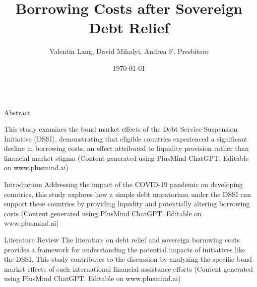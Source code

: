 \documentclass[final]{beamer}
\title{\Huge Borrowing Costs after Sovereign Debt Relief} %
\author{\Large Valentin Lang, David Mihalyi, Andrea F. Presbitero} %
\institute{\Large University of Mannheim, Natural Resource Governance Institute, Johns Hopkins University} %
\date{\Large\today} %
\begin{document}
\begin{frame}[t]

\begin{block}{}
\centering
\maketitle
\end{block}

\begin{columns}[T] %

\begin{column}{.32\textwidth}
    \begin{block}{\Huge Abstract} %


    \Large %
    This study examines the bond market effects of the Debt Service Suspension Initiative (DSSI), demonstrating that eligible countries experienced a significant decline in borrowing costs, an effect attributed to liquidity provision rather than financial market stigma
    \normalsize (Content generated using PlusMind ChatGPT. Editable on www.plusmind.ai)
    \end{block}

    \vspace{1cm} %

    \begin{block}{\Huge Introduction} %
    \Large %
    Addressing the impact of the COVID-19 pandemic on developing countries, this study explores how a simple debt moratorium under the DSSI can support these countries by providing liquidity and potentially altering borrowing costs
    \normalsize (Content generated using PlusMind ChatGPT. Editable on www.plusmind.ai)
    \end{block}

    \vspace{1cm} %

    \begin{block}{\Huge Literature Review} %
    \Large %
    The literature on debt relief and sovereign borrowing costs provides a framework for understanding the potential impacts of initiatives like the DSSI. This study contributes to the discussion by analyzing the specific bond market effects of such international financial assistance efforts
    \normalsize (Content generated using PlusMind ChatGPT. Editable on www.plusmind.ai)
    \end{block}
\end{column}


\end{columns}
\end{frame}
\end{document}

